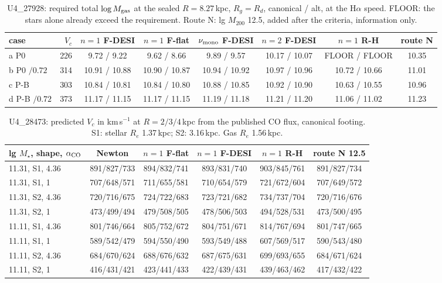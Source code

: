 \begin{table}[h]\centering\small\caption{U4\_27928: required total $\log M_{\rm gas}$ at the sealed $R=8.27$\,kpc, $R_g=R_d$, canonical / alt, at the H$\alpha$ speed. FLOOR: the stars alone already exceed the requirement. Route N: lg $M_{200}$ 12.5, added after the criteria, information only.}\label{t:u4a}\begin{tabular}{lrcccccc}\toprule
case & $V_c$ & $n{=}1$ F-DESI & $n{=}1$ F-flat & $\nu_{\rm mono}$ F-DESI & $n{=}2$ F-DESI & $n{=}1$ R-H & route N \\ \midrule
a P0 & 226 & 9.72 / 9.22 & 9.62 / 8.66 & 9.89 / 9.57 & 10.17 / 10.07 & FLOOR / FLOOR & 10.35 \\
b P0 $/0.72$ & 314 & 10.91 / 10.88 & 10.90 / 10.87 & 10.94 / 10.92 & 10.97 / 10.96 & 10.72 / 10.66 & 11.01 \\
c P-B & 303 & 10.84 / 10.81 & 10.84 / 10.80 & 10.88 / 10.85 & 10.92 / 10.90 & 10.63 / 10.55 & 10.96 \\
d P-B $/0.72$ & 373 & 11.17 / 11.15 & 11.17 / 11.15 & 11.19 / 11.18 & 11.21 / 11.20 & 11.06 / 11.02 & 11.23 \\
\bottomrule\end{tabular}\end{table}
\begin{table}[h]\centering\small\caption{U4\_28473: predicted $V_c$ in km\,s$^{-1}$ at $R=2/3/4$\,kpc from the published CO flux, canonical footing. S1: stellar $R_e$ 1.37\,kpc; S2: 3.16\,kpc. Gas $R_e$ 1.56\,kpc.}\label{t:fw}\begin{tabular}{lccccc}\toprule
lg $M_\star$, shape, $\alpha_{\rm CO}$ & Newton & $n{=}1$ F-flat & $n{=}1$ F-DESI & $n{=}1$ R-H & route N 12.5 \\ \midrule
11.31, S1, 4.36 & 891/827/733 & 894/832/741 & 893/831/740 & 903/845/761 & 891/827/734 \\
11.31, S1, 1 & 707/648/571 & 711/655/581 & 710/654/579 & 721/672/604 & 707/649/572 \\
11.31, S2, 4.36 & 720/716/675 & 724/722/683 & 723/721/682 & 734/737/704 & 720/716/676 \\
11.31, S2, 1 & 473/499/494 & 479/508/505 & 478/506/503 & 494/528/531 & 473/500/495 \\
11.11, S1, 4.36 & 801/746/664 & 805/752/672 & 804/751/671 & 814/767/694 & 801/747/665 \\
11.11, S1, 1 & 589/542/479 & 594/550/490 & 593/549/488 & 607/569/517 & 590/543/480 \\
11.11, S2, 4.36 & 684/670/624 & 688/676/632 & 687/675/631 & 699/693/655 & 684/671/624 \\
11.11, S2, 1 & 416/431/421 & 423/441/433 & 422/439/431 & 439/463/462 & 417/432/422 \\
\bottomrule\end{tabular}\end{table}

